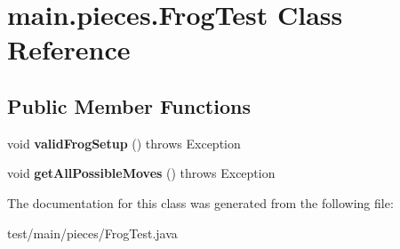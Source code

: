 \hypertarget{classmain_1_1pieces_1_1_frog_test}{}\section{main.\+pieces.\+Frog\+Test Class Reference}
\label{classmain_1_1pieces_1_1_frog_test}
\subsection*{Public Member Functions}
\begin{DoxyCompactItemize}
\item 
\mbox{\label{classmain_1_1pieces_1_1_frog_test_a4a5d2dac4a655f12a80e4ab8ebe3da09}} 
void {\bfseries valid\+Frog\+Setup} ()  throws Exception 
\item 
\mbox{\label{classmain_1_1pieces_1_1_frog_test_a4ccb92d280002abeefbc62f6e98b9184}} 
void {\bfseries get\+All\+Possible\+Moves} ()  throws Exception 
\end{DoxyCompactItemize}


The documentation for this class was generated from the following file\+:\begin{DoxyCompactItemize}
\item 
test/main/pieces/Frog\+Test.\+java\end{DoxyCompactItemize}
